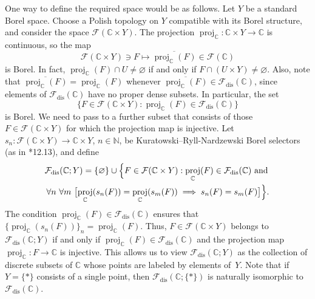 \documentclass[12pt]{paper}
\numberwithin{equation}{section}
\theoremstyle{plain}
\theoremstyle{definition}
\newcommand{\C}{\mathbb{C}}
\newcommand{\N}{\mathbb{N}}
\newcommand{\effros}[1]{\mathcal{F}(#1)}
\newcommand{\effrosdis}[1]{\mathcal{F}_{\textrm{dis}}(#1)}
\DeclareMathOperator{\proj}{\mathrm{proj}}
\begin{document}
One way to define the required space would be as follows.  Let \(Y\) be a standard Borel space.
Choose a Polish topology on \(Y\) compatible with its Borel structure, and consider the space
\(\effros{\C \times Y}\).  The projection \(\proj_{\C} : \C \times Y \to \C\) is continuous, so the
map
\[
\effros{\C\times Y} \ni F \mapsto \overline{\proj_{\C}(F)} \in \effros{\C}
\]
is Borel.  In fact, \(\proj_{\C}(F) \cap U \ne \varnothing\) if and only if
\(F \cap (U \times Y) \ne \varnothing\). Also, note that
\(\overline{\proj_{\C}(F)} = \proj_{\C}(F)\) whenever
\(\overline{\proj_{\C}(F)} \in \effrosdis{\C}\), since elements of \(\effrosdis{\C}\) have no proper
dense subsets.  In particular, the set
\[
\{F \in \effros{\C \times Y} : \proj_{\C}(F) \in \effrosdis{\C}\}
\]
is Borel.  We need to pass to a further subset that consists of those \(F \in \effros{\C\times Y}\)
for which the projection map is injective.  Let \(s_{n} : \effros{\C\times Y} \to \C \times Y\),
\(n \in \N\), be Kuratowski--Ryll-Nardzewski Borel selectors (as in \cite{Kechris}*{12.13}), and
define
\begin{multline*}
  \effrosdis{\C; Y} = \{\varnothing\} \cup \Bigl\{F \in \effros{\C \times Y} :
  \proj_{\C}(F) \in \effrosdis{\C} \textrm{ and } \\
  \forall n\ \forall m\ \bigl[ \proj_{\C}(s_{n}(F)) = \proj_{\C}(s_{m}(F)) \implies s_{n}(F)
  = s_{m}(F) \bigr]\Bigr\}.
\end{multline*}
The condition \(\proj_{\C}(F) \in \effrosdis{\C}\) ensures that
\(\{\proj_{\C}(s_{n}(F))\}_{n} = \proj_{\C}(F)\). Thus, \(F \in \effros{\C \times Y}\) belongs to
\(\effrosdis{\C; Y}\) if and only if \(\proj_{\C}(F) \in \effrosdis{\C}\) and the projection map
\(\proj_{\C} : F \to \C\) is injective.  This allows us to view \(\effrosdis{\C; Y}\) as the
collection of discrete subsets of \(\C\) whose points are labeled by elements of~\(Y\).  Note that
if \(Y = \{*\}\) consists of a single point, then \(\effrosdis{\C; \{*\}}\) is naturally isomorphic
to \(\effrosdis{\C}\).
\end{document}
